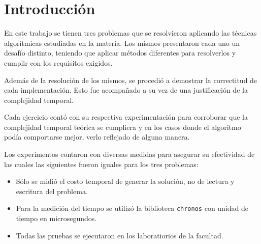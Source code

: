 \section{Introducción}

En este trabajo se tienen tres problemas que se resolvieron aplicando las
técnicas algorítmicas estudiadas en la materia. Los mismos presentaron cada uno un desafío
distinto, teniendo que aplicar métodos diferentes para resolverlos y cumplir
con los requisitos exigidos.

Además de la resolución de los mismos, se procedió a demostrar la correctitud de
cada implementación. Esto fue acompañado a su vez de una justificación de la
complejidad temporal.

Cada ejercicio contó con su respectiva experimentación para corroborar que la
complejidad temporal teórica se cumpliera y en los casos donde el algoritmo
podía comportarse mejor, verlo reflejado de alguna manera.

Los experimentos contaron con diversas medidas para asegurar su efectividad de
las cuales las siguientes fueron iguales para los tres problemas:
\begin{itemize}
	\item{Sólo se midió el costo temporal de generar la solución, no
			de lectura y escritura del problema.}
	\item{Para la medición del tiempo se utilizó la biblioteca \texttt{chronos}
			con unidad de tiempo en microsegundos.}
	\item{Todas las pruebas se ejecutaron en los laboratiorios de la facultad.}
\end{itemize}
